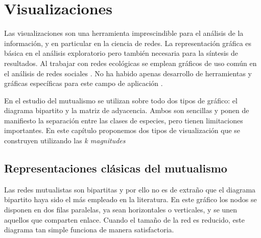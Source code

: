 
\chapter{Visualizaciones} %
\label{chapterVISUALIZACIONES}

Las visualizaciones son una herramienta imprescindible para el análisis de la información, y en particular en la ciencia de redes. La representación gráfica es básica en el análisis exploratorio pero también necesaria para la síntesis de resultados. Al trabajar con redes ecológicas se emplean gráficos de uso común en el análisis de redes sociales \cite{freeman2012social}. No ha habido apenas desarrollo de herramientas y gráficas específicas para este campo de aplicación \cite{yoon20043d, kazanci2007econet}.

En el estudio del mutualismo se utilizan sobre todo dos tipos de gráfico: el diagrama bipartito y la matriz de adyacencia. Ambos son sencillas y ponen de manifiesto la separación entre las clases de especies, pero tienen limitaciones importantes. En este capítulo proponemos dos tipos de visualización que se construyen utilizando las \textit{k magnitudes}

\label{VISUALIZACIÓN} %


\section{Representaciones clásicas del mutualismo}

Las redes mutualistas son bipartitas y por ello no es de extraño que el diagrama bipartito haya sido el más empleado en la literatura. En este 
gráfico los nodos se disponen en dos filas paralelas, ya sean horizontales o verticales, y se unen aquellos que comparten enlace. Cuando el tamaño
de la red es reducido, este diagrama tan simple funciona de manera satisfactoria.

